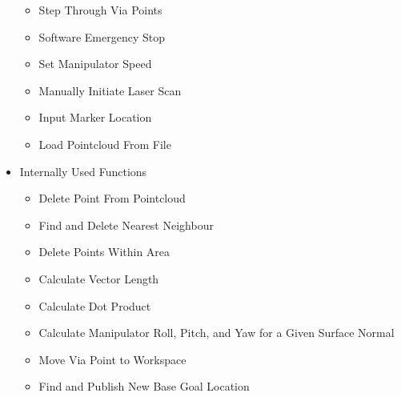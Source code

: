 \begin{itemize}
\begin{itemize}
\item Step Through Via Points
\item Software Emergency Stop
\item Set Manipulator Speed
\item Manually Initiate Laser Scan
\item Input Marker Location
\item Load Pointcloud From File
\end{itemize}
\item Internally Used Functions
\begin{itemize}
\item Delete Point From Pointcloud
\item Find and Delete Nearest Neighbour
\item Delete Points Within Area
\item Calculate Vector Length
\item Calculate Dot Product
\item Calculate Manipulator Roll, Pitch, and Yaw for a Given Surface Normal
\item Move Via Point to Workspace
\item Find and Publish New Base Goal Location
\end{itemize}
\end{itemize}
